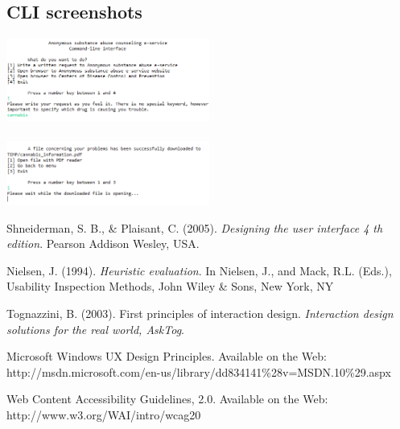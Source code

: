 \documentclass[a4paper,12pt, twocolumn]{article}
\begin{document}
\subsection{CLI screenshots}

\begin{center}
\includegraphics[width=0.5\textwidth]{images/cli_screen_1.png}
\label{cli_1}
~\\~\\

\includegraphics[width=0.5\textwidth]{images/cli_screen_2.png}
\label{cli_1}
\end{center}




\begin{thebibliography}{9}

  Shneiderman, S. B., \& Plaisant, C. (2005). \emph{Designing the user interface 4 th edition}. Pearson Addison Wesley, USA.

  Nielsen, J. (1994). \emph{Heuristic evaluation}. In Nielsen, J., and Mack, R.L. (Eds.), Usability Inspection Methods, John Wiley \& Sons, New York, NY

  Tognazzini, B. (2003). First principles of interaction design. \emph{Interaction design solutions for the real world, AskTog}.
  
 Microsoft Windows UX Design Principles. Available on the Web: http://msdn.microsoft.com/en-us/library/dd834141\%28v=MSDN.10\%29.aspx

Web Content Accessibility Guidelines, 2.0. Available on the Web: http://www.w3.org/WAI/intro/wcag20

\end{thebibliography}
\end{document}
